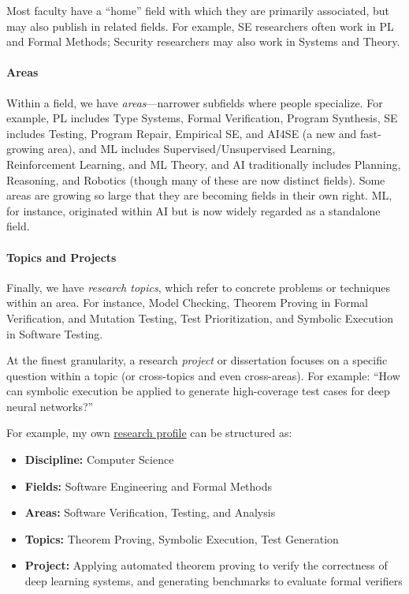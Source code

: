 \documentclass[oneside,11pt]{book}
\newenvironment{commentbox}[1][]{
  \small
  \begin{marker}[\faChessPawn{}]
    {\textbf{#1}}
  }{
  \end{marker}
}
\begin{document}
Most faculty have a ``home'' field with which they are primarily associated, but may also publish in related fields. For example, SE researchers often work in PL and Formal Methods; Security researchers may also work in Systems and Theory.

\paragraph{Areas} Within a field, we have \emph{areas}---narrower subfields where people specialize. For example,  PL includes Type Systems, Formal Verification, Program Synthesis, SE includes Testing, Program Repair, Empirical SE, and AI4SE (a new and fast-growing area), and
ML includes Supervised/Unsupervised Learning, Reinforcement Learning, and ML Theory, and
AI traditionally includes Planning, Reasoning, and Robotics (though many of these are now distinct fields).
Some areas are growing so large that they are becoming fields in their own right. ML, for instance, originated within AI but is now widely regarded as a standalone field.

\paragraph{Topics and Projects}  Finally, we have \emph{research topics}, which refer to concrete problems or techniques within an area. For instance, 
 Model Checking, Theorem Proving in Formal Verification, and Mutation Testing, Test Prioritization, and Symbolic Execution in Software Testing.


At the finest granularity, a research \emph{project} or dissertation focuses on a specific question within a topic (or cross-topics and even cross-areas).  For example: ``How can symbolic execution be applied to generate high-coverage test cases for deep neural networks?''

\begin{commentbox}
    For example, my own \href{https://roars.dev}{research profile} can be structured as:
    \begin{itemize}
        \item \textbf{Discipline:} Computer Science
        \item \textbf{Fields:} Software Engineering and Formal Methods
        \item \textbf{Areas:} Software Verification, Testing, and Analysis
        \item \textbf{Topics:} Theorem Proving, Symbolic Execution, Test Generation
        \item \textbf{Project:} Applying automated theorem proving to verify the correctness of deep learning systems, and generating benchmarks to evaluate formal verifiers
    \end{itemize}
\end{commentbox}
\end{document}
